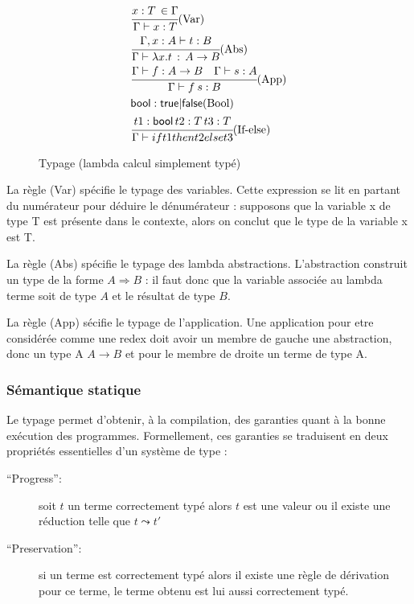 \documentclass{article}
\theoremstyle{definition}
\theoremstyle{remark}
\begin{document}
\begin{figure}

\begin{align*}
&  \cfrac{x:T\,\in\Gamma}
         {\Gamma\vdash x:T}\mbox{(Var)} 
  \\
&  \cfrac{\Gamma, x:A \vdash t:B}
         {\Gamma \vdash \lambda x. t \,:\, A\rightarrow B}\mbox{(Abs)} \\
&  \cfrac{\Gamma \vdash f : A\rightarrow B \quad
          \Gamma \vdash s : A}
         {\Gamma\vdash f\: s : B}\mbox{(App)} \\
&  \mathsf{bool}:\mathsf{true}|\mathsf{false}\mbox{(Bool)} \\
&  \cfrac{t1:\mathsf{bool}\,t2:T\,t3:T}
         {\Gamma\vdash if t1 then t2 else t3}\mbox{(If-else)} \\
\end{align*}

\caption{Typage (lambda calcul simplement typé)}
\label{fig:typage-simple}
\end{figure}

La règle (Var) spécifie le typage des variables. Cette expression se
lit en partant du numérateur pour déduire le dénumérateur : supposons
que la variable x de type T est présente dans le contexte, alors on
conclut que le type de la variable x est T.

La règle (Abs) spécifie le typage des lambda
abstractions. L'abstraction construit un type de la forme \(A
\Rightarrow B\) : il faut donc que la variable associée au lambda
terme soit de type \(A\) et le résultat de type \(B\).

La règle (App) sécifie le typage de l'application. Une application pour etre 
considérée comme une redex doit avoir un membre de gauche une abstraction, 
donc un type A \(A\rightarrow B\) et pour le membre de droite un terme 
de type A. 
               

\subsubsection{Sémantique statique}

Le typage permet d'obtenir, à la compilation, des garanties quant à la
bonne exécution des programmes.  Formellement, ces garanties se traduisent en deux propriétés essentielles d'un système de type :
\begin{description}
\item[``Progress'':] soit \(t\) un terme correctement typé alors \(t\) est une valeur ou il
 existe une réduction telle que \(t \leadsto t'\)
\item[``Preservation'':] si un terme est correctement typé alors il existe une règle
 de dérivation pour ce terme, le terme obtenu est lui aussi correctement
 typé.
\end{description}
\end{document}
